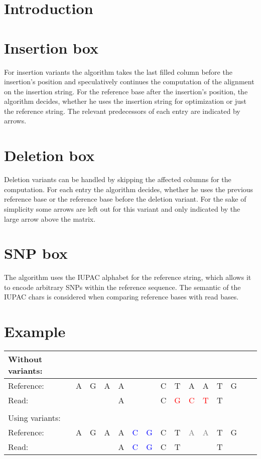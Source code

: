\documentclass[english]{short}
\begin{document}
\section{Introduction}


\section{Insertion box}
For insertion variants the algorithm takes the last filled column before the insertion's position and speculatively continues the computation of the alignment on the insertion string. For the reference base after the insertion's position, the algorithm decides, whether he uses the insertion string for optimization or just the reference string. The relevant predecessors of each entry are indicated by arrows.

\section{Deletion box}
Deletion variants can be handled by skipping the affected columns for the computation. For each entry the algorithm decides, whether he uses the previous reference base or the reference base before the deletion variant. For the sake of simplicity some arrows are left out for this variant and only indicated by the large arrow above the matrix.

\section{SNP box}
The algorithm uses the IUPAC alphabet for the reference string, which allows it to encode arbitrary SNPs within the reference sequence. The semantic of the IUPAC chars is considered when comparing reference bases with read bases.

\section{Example}
\begin{tabular}{lcccccccccccccc}
Without variants:\\
\hline
Reference: & A & G & A & A & & &  C & T & A & A & T & G\\
Read: & & & & A & & & C & \textcolor{red}{G} & \textcolor{red}{C} & \textcolor{red}{T} & T\\
\\
Using variants:\\
\hline
Reference: & A & G & A & A & \textcolor{blue}{C} & \textcolor{blue}{G} & C & T & \textcolor{gray}{A} & \textcolor{gray}{A} & T & G\\
Read: & & & & A & \textcolor{blue}{C} & \textcolor{blue}{G} & C & T & & & T\\

\end{tabular}
\end{document}
